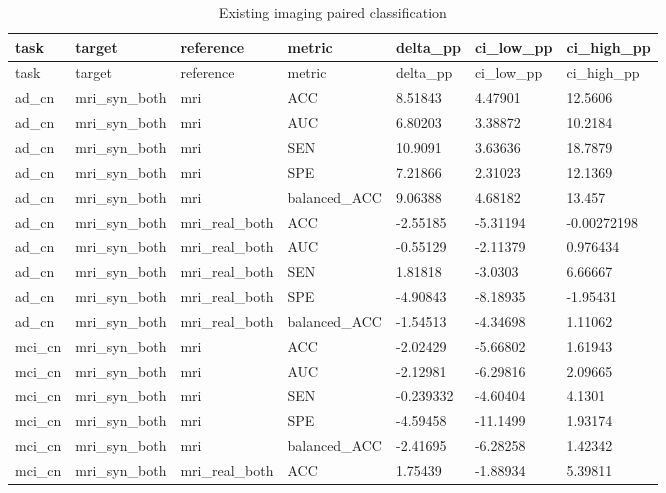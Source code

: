 \begin{landscape}
\begingroup
\footnotesize
\setlength{\tabcolsep}{4pt}
\begin{longtable}{lllllll}
\caption{Existing imaging paired classification}\label{tab:s-n14}\\
\toprule
task & target & reference & metric & delta\_pp & ci\_low\_pp & ci\_high\_pp \\
\midrule
\endfirsthead
\toprule
task & target & reference & metric & delta\_pp & ci\_low\_pp & ci\_high\_pp \\
\midrule
\endhead
\bottomrule
\endfoot
ad\_cn & mri\_syn\_both & mri & ACC & 8.51843 & 4.47901 & 12.5606 \\
ad\_cn & mri\_syn\_both & mri & AUC & 6.80203 & 3.38872 & 10.2184 \\
ad\_cn & mri\_syn\_both & mri & SEN & 10.9091 & 3.63636 & 18.7879 \\
ad\_cn & mri\_syn\_both & mri & SPE & 7.21866 & 2.31023 & 12.1369 \\
ad\_cn & mri\_syn\_both & mri & balanced\_ACC & 9.06388 & 4.68182 & 13.457 \\
ad\_cn & mri\_syn\_both & mri\_real\_both & ACC & -2.55185 & -5.31194 & -0.00272198 \\
ad\_cn & mri\_syn\_both & mri\_real\_both & AUC & -0.55129 & -2.11379 & 0.976434 \\
ad\_cn & mri\_syn\_both & mri\_real\_both & SEN & 1.81818 & -3.0303 & 6.66667 \\
ad\_cn & mri\_syn\_both & mri\_real\_both & SPE & -4.90843 & -8.18935 & -1.95431 \\
ad\_cn & mri\_syn\_both & mri\_real\_both & balanced\_ACC & -1.54513 & -4.34698 & 1.11062 \\
mci\_cn & mri\_syn\_both & mri & ACC & -2.02429 & -5.66802 & 1.61943 \\
mci\_cn & mri\_syn\_both & mri & AUC & -2.12981 & -6.29816 & 2.09665 \\
mci\_cn & mri\_syn\_both & mri & SEN & -0.239332 & -4.60404 & 4.1301 \\
mci\_cn & mri\_syn\_both & mri & SPE & -4.59458 & -11.1499 & 1.93174 \\
mci\_cn & mri\_syn\_both & mri & balanced\_ACC & -2.41695 & -6.28258 & 1.42342 \\
mci\_cn & mri\_syn\_both & mri\_real\_both & ACC & 1.75439 & -1.88934 & 5.39811 \\

\end{longtable}
\end{landscape}
